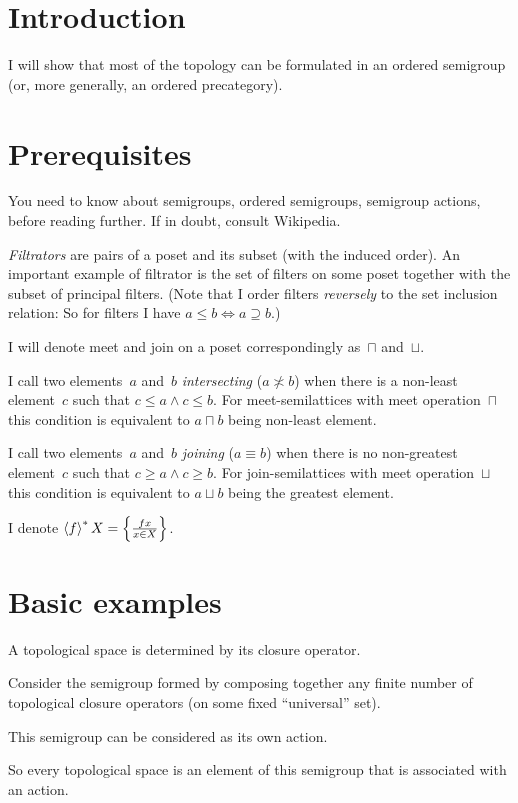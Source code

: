 \chapter{Introduction}

I will show that most of the topology can be formulated in an ordered semigroup (or, more generally, an ordered precategory).

\chapter{Prerequisites}

You need to know about semigroups, ordered semigroups, semigroup actions, before reading further. If in doubt, consult Wikipedia.

\emph{Filtrators} are pairs of a poset and its subset (with the induced order). An important example of filtrator is the set of filters on some poset together with the subset of principal filters. (Note that I order filters \emph{reversely} to the set inclusion relation: So for filters I have $a\leq b \Leftrightarrow a\supseteq b$.)

I will denote meet and join on a poset correspondingly as~$\sqcap$ and~$\sqcup$.

I call two elements~$a$ and~$b$ \emph{intersecting} ($a\nasymp b$) when there is a non-least element~$c$ such that $c\leq a\land c\leq b$. For meet-semilattices with meet operation~$\sqcap$ this condition is equivalent to $a\sqcap b$ being non-least element.

I call two elements~$a$ and~$b$ \emph{joining} ($a\equiv b$) when there is no non-greatest element~$c$ such that $c\geq a\land c\geq b$. For join-semilattices with meet operation~$\sqcup$ this condition is equivalent to $a\sqcup b$ being the greatest element.

I denote $\left\langle f\right\rangle ^{\ast}X = \left\{ \frac{fx}{x\in X}\right\}$.

\chapter{Basic examples}

A topological space is determined by its closure operator.

Consider the semigroup formed by composing together any finite number of topological closure operators (on some fixed ``universal'' set).

This semigroup can be considered as its own action.

So every topological space is an element of this semigroup that is associated with an action.

